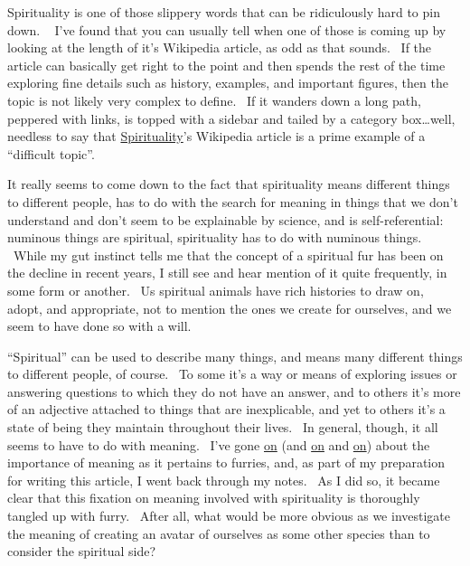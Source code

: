 Spirituality is one of those slippery words that can be ridiculously
hard to pin down. ~ I've found that you can usually tell when one of
those is coming up by looking at the length of it's Wikipedia article,
as odd as that sounds. ~If the article can basically get right to the
point and then spends the rest of the time exploring fine details such
as history, examples, and important figures, then the topic is not
likely very complex to define. ~If it wanders down a long path, peppered
with links, is topped with a sidebar and tailed by a category
box\ldots{}well, needless to say that
\href{http://en.wikipedia.org/wiki/Spirituality}{Spirituality}'s
Wikipedia article is a prime example of a ``difficult topic''.

It really seems to come down to the fact that spirituality means
different things to different people, has to do with the search for
meaning in things that we don't understand and don't seem to be
explainable by science, and is self-referential: numinous things are
spiritual, spirituality has to do with numinous things. ~While my gut
instinct tells me that the concept of a spiritual fur has been on the
decline in recent years, I still see and hear mention of it quite
frequently, in some form or another. ~Us spiritual animals have rich
histories to draw on, adopt, and appropriate, not to mention the ones we
create for ourselves, and we seem to have done so with a will.

``Spiritual'' can be used to describe many things, and means many
different things to different people, of course. ~To some it's a way or
means of exploring issues or answering questions to which they do not
have an answer, and to others it's more of an adjective attached to
things that are inexplicable, and yet to others it's a state of being
they maintain throughout their lives. ~In general, though, it all seems
to have to do with meaning. ~I've gone
\href{http://adjectivespecies.com/2012/04/11/meaning-within-a-subculture-part-1/}{on}
(and
\href{http://adjectivespecies.com/2012/04/12/meaning-within-a-subculture-part-2/}{on}
and
\href{http://adjectivespecies.com/2012/04/13/meaning-within-a-subculture-part-3/}{on})
about the importance of meaning as it pertains to furries, and, as part
of my preparation for writing this article, I went back through my
notes. ~As I did so, it became clear that this fixation on meaning
involved with spirituality is thoroughly tangled up with furry. ~After
all, what would be more obvious as we investigate the meaning of
creating an avatar of ourselves as some other species than to consider
the spiritual side?

